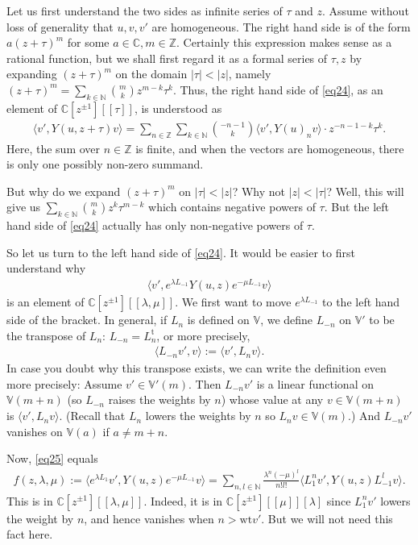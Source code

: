 \documentclass[11pt,b5paper,notitlepage]{article}
\theoremstyle{definition}
\theoremstyle{plain}
\newcommand{\tr}{\mathrm{t}} %
\newcommand{\bk}[1]{\langle {#1}\rangle}
\newcommand{\bigbk}[1]{\big\langle {#1}\big\rangle}
\newcommand{\Vbb}{\mathbb V}
\newcommand{\Cbb}{\mathbb C}
\newcommand{\Nbb}{\mathbb N}
\newcommand{\Zbb}{\mathbb Z}
\newcommand{\wt}{\mathrm{wt}}
\numberwithin{equation}{section}
\begin{document}
Let us first understand the two sides as infinite series of $\tau$ and $z$. Assume without loss of generality that $u,v,v'$ are homogeneous. The right hand side is of the form $a(z+\tau)^m$ for some $a\in\Cbb,m\in\Zbb$. Certainly this expression makes sense as a rational function, but we shall first regard it as a formal series of $\tau,z$ by expanding $(z+\tau)^m$ on the domain $|\tau|<|z|$, namely $(z+\tau)^m=\sum_{k\in\Nbb}{m\choose k} z^{m-k}\tau^k$. Thus, the right hand side of \eqref{eq24}, as an element of $\Cbb[z^{\pm 1}][[\tau]]$, is understood as
\begin{align*}
\bigbk{v',Y(u,z+\tau)v}=\sum_{n\in\Zbb}\sum_{k\in\Nbb}{-n-1\choose k}	\bigbk{v',Y(u)_nv}\cdot z^{-n-1-k}\tau^k.
\end{align*}
Here, the sum over $n\in\Zbb$ is finite, and when the vectors are homogeneous, there is only one possibly non-zero summand.

But why do we expand $(z+\tau)^m$ on $|\tau|<|z|$? Why not $|z|<|\tau|$? Well, this will give us $\sum_{k\in\Nbb}{m\choose k}z^k\tau^{m-k}$ which contains negative powers of $\tau$. But the left hand side of \eqref{eq24} actually has only non-negative powers of $\tau$.

So let us turn to the left hand side of \eqref{eq24}. It would be easier to first understand why
\begin{align}
\bigbk{v',e^{\lambda L_{-1}}Y(u,z)e^{-\mu L_{-1}}v}	\label{eq25}
\end{align}
is an element of $\Cbb[z^{\pm1}][[\lambda,\mu]]$. We first want to move $e^{\lambda L_{-1}}$ to the left hand side of the bracket. In general, if $L_n$ is defined on $\Vbb$, we define $L_{-n}$ on $\Vbb'$ to be the transpose of $L_n$: $L_{-n}=L_n^\tr$, or more precisely,
\begin{align}
\bk{L_{-n}v',v}:=\bk{v',L_nv}.	
\end{align}
In case you doubt why this transpose exists, we can write the definition even more precisely: Assume $v'\in\Vbb'(m)$. Then $L_{-n}v'$ is a linear functional on $\Vbb(m+n)$ (so $L_{-n}$ raises the weights by $n$) whose value at any $v\in\Vbb(m+n)$ is $\bk{v',L_nv}$. (Recall that $L_n$ lowers the weights by $n$ so $L_nv\in\Vbb(m)$.) And $L_{-n}v'$ vanishes on $\Vbb(a)$ if $a\neq m+n$.



Now,  \eqref{eq25} equals
\begin{align}
f(z,\lambda,\mu):=\bigbk{e^{\lambda L_1}v',Y(u,z)e^{-\mu L_{-1}}v}=\sum_{n,l\in\Nbb}\frac{\lambda^n(-\mu)^l}{n!l!}\bigbk{L_1^nv',Y(u,z)L_{-1}^lv}.	
\end{align}
This is in $\Cbb[z^{\pm1}][[\lambda,\mu]]$. Indeed, it is in $\Cbb[z^{\pm1}][[\mu]][\lambda]$ since $L_1^nv'$ lowers the weight by $n$, and hence vanishes when $n>\wt v'$. But we will not need this fact here. 
\end{document}
